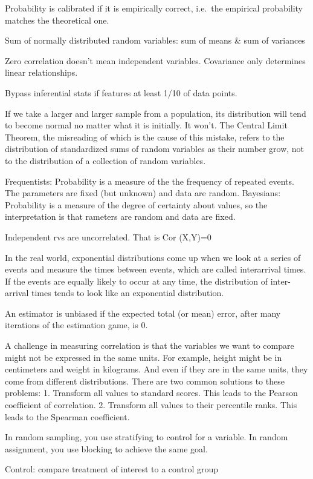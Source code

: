 \documentclass[]{book}
\begin{document}
Probability is calibrated if it is empirically correct, i.e.~the empirical probability matches the theoretical one.

Sum of normally distributed random variables: sum of means \& sum of variances

Zero correlation doesn't mean independent variables. Covariance only determines linear relationships.

Bypass inferential stats if features at least 1/10 of data points.

If we take a larger and larger sample from a population, its distribution will tend to become normal no matter what it is initially. It won't. The Central Limit Theorem, the misreading of which is the cause of this mistake, refers to the distribution of standardized sums of random variables as their number grow, not to the distribution of a collection of random variables.

Frequentists: Probability is a measure of the the frequency of repeated events. The parameters are fixed (but unknown) and data are random. Bayesians: Probability is a measure of the degree of certainty about values, so the interpretation is that rameters are random and data are fixed.

Independent rvs are uncorrelated. That is Cor (X,Y)=0

In the real world, exponential distributions come up when we look at a series of events and measure the times between events, which are called interarrival times. If the events are equally likely to occur at any time, the distribution of inter-arrival times tends to look like an exponential distribution.

An estimator is unbiased if the expected total (or mean) error, after many iterations of the estimation game, is 0.

A challenge in measuring correlation is that the variables we want to compare might not be expressed in the same units. For example, height might be in centimeters and weight in kilograms. And even if they are in the same
units, they come from different distributions. There are two common solutions to these problems: 1. Transform all values to standard scores. This leads to the Pearson coefficient of correlation. 2. Transform all values to their percentile ranks. This leads to the Spearman coefficient.

In random sampling, you use stratifying to control for a variable. In random assignment, you use blocking to achieve the same goal.

Control: compare treatment of interest to a control group
\end{document}
